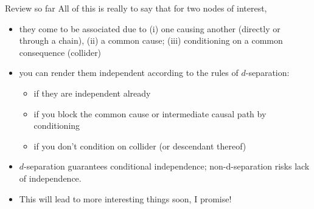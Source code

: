 \documentclass[xcolor=dvipsnames]{beamer}
\begin{document}
\begin{frame}{Review so far}
All of this is really to say that for two nodes of interest,\\
\begin{itemize}
\item<2-> they come to be associated due to (i) one causing another (directly or through a chain), (ii) a common cause; (iii) conditioning on a common consequence (collider) 
\smallskip
\item<3-> you can render them independent according to the rules of $d$-separation:
\begin{itemize}
\item if they are independent already
\item if you block the common cause or intermediate causal path by conditioning
\item if you don't condition on collider (or descendant thereof)
\end{itemize}
\item<4-> $d$-separation guarantees conditional independence; non-d-separation risks lack of independence.
\item<5-> This will lead to more interesting things soon, I promise!
\end{itemize}
\end{frame}
\end{document}
